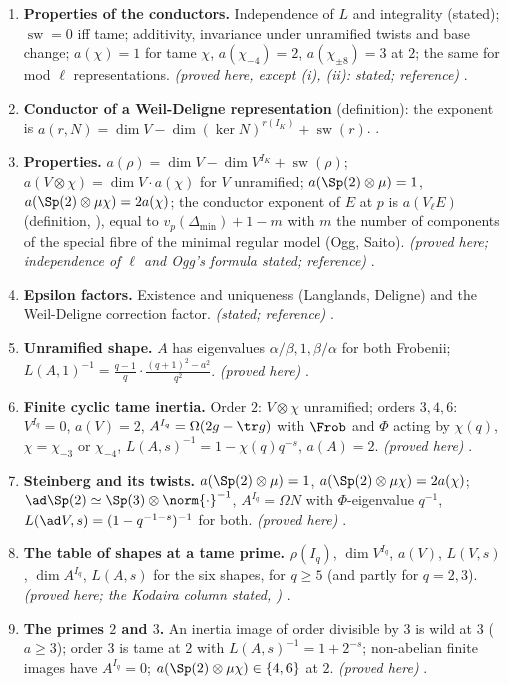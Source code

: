 \begin{enumerate}[label=\textbf{\thechapter.\arabic*}]
\item \textbf{Properties of the conductors.} Independence of $L$ and integrality (stated); $\operatorname{sw}=0$ iff tame; additivity, invariance under unramified twists and base change;
$a(\chi)=1$ for tame $\chi$, $a(\chi_{-4})=2$, $a(\chi_{\pm8})=3$ at $2$; the same for mod $\ell$ representations. \emph{(proved here, except (i), (ii): stated; reference)}
.
\item \textbf{Conductor of a Weil-Deligne representation} (definition): the exponent is
$a(r,N)=\dim V-\dim(\ker N)^{r(I_K)}+\operatorname{sw}(r)$. .
\item \textbf{Properties.} $a(\rho)=\dim V-\dim V^{I_K}+\operatorname{sw}(\rho)$; $a(V\otimes\chi)=\dim V\cdot a(\chi)$ for $V$ unramified; $a(\Sp(2)\otimes\mu)=1$, $a(\Sp(2)\otimes\mu\chi)=2a(\chi)$; the conductor
exponent of $E$ at $p$ is $a(V_\ell E)$ (definition, ), equal to $v_p(\Delta_{\min})+1-m$ with $m$ the number of components of the
special fibre of the minimal regular model (Ogg, Saito). \emph{(proved here; independence of $\ell$ and Ogg's formula stated; reference)} .
\item \textbf{Epsilon factors.} Existence and uniqueness (Langlands, Deligne) and the Weil-Deligne correction factor. \emph{(stated; reference)} .
\item \textbf{Unramified shape.} $A$ has eigenvalues $\alpha/\beta,1,\beta/\alpha$ for both Frobenii; $L(A,1)^{-1}=\frac{q-1}q\cdot\frac{(q+1)^2-a^2}{q^2}$. \emph{(proved here)}
.
\item \textbf{Finite cyclic tame inertia.} Order $2$: $V\otimes\chi$ unramified; orders $3,4,6$: $V^{I_q}=0$, $a(V)=2$, $A^{I_q}=\Omega(2g-\tr g)$ with $\Frob$ and $\Phi$ acting by $\chi(q)$,
$\chi=\chi_{-3}$ or $\chi_{-4}$, $L(A,s)^{-1}=1-\chi(q)q^{-s}$, $a(A)=2$. \emph{(proved here)} .
\item \textbf{Steinberg and its twists.} $a(\Sp(2)\otimes\mu)=1$, $a(\Sp(2)\otimes\mu\chi)=2a(\chi)$; $\ad\Sp(2)\simeq\Sp(3)\otimes\norm{\cdot}^{-1}$, $A^{I_q}=\Omega N$ with $\Phi$-eigenvalue $q^{-1}$,
$L(\ad V,s)=(1-q^{-1-s})^{-1}$ for both. \emph{(proved here)} .
\item \textbf{The table of shapes at a tame prime.} $\rho(I_q)$, $\dim V^{I_q}$, $a(V)$, $L(V,s)$, $\dim A^{I_q}$, $L(A,s)$ for the six shapes, for $q\ge5$ (and partly for
$q=2,3$). \emph{(proved here; the Kodaira column
stated, )} .
\item \textbf{The primes $2$ and $3$.} An inertia image of order divisible by $3$ is wild at $3$ ($a\ge3$); order $3$ is tame at $2$ with $L(A,s)^{-1}=1+2^{-s}$; non-abelian finite
images have $A^{I_q}=0$; $a(\Sp(2)\otimes\mu\chi)\in\{4,6\}$ at $2$. \emph{(proved here)} .
\end{enumerate}

